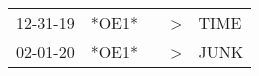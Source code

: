 \begin{supertabular}{p{0.07\textwidth}p{0.06\textwidth}p{0.02\textwidth}p{0.02\textwidth}p{0.06\textwidth}}
 12-31-19\textsuperscript{} &  *OE1* &   &  \textgreater &  TIME\textsuperscript{} \\
 02-01-20\textsuperscript{} &  *OE1* &   &  \textgreater &  JUNK\textsuperscript{} \\
\end{supertabular}
